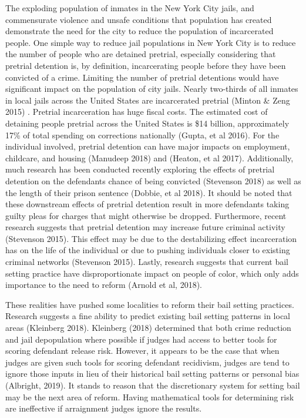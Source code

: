 \documentclass[
  english,
  man]{apa6}
\begin{document}
The exploding population of inmates in the New York City jails, and commensurate violence and unsafe conditions that population has created demonstrate the need for the city to reduce the population of incarcerated people. One simple way to reduce jail populations in New York City is to reduce the number of people who are detained pretrial, especially considering that pretrial detention is, by definition, incarcerating people before they have been convicted of a crime. Limiting the number of pretrial detentions would have significant impact on the population of city jails. Nearly two-thirds of all inmates in local jails across the United States are incarcerated pretrial (Minton \& Zeng 2015) . Pretrial incarceration has huge fiscal costs. The estimated cost of detaining people pretrial across the United States is \$14 billion, approximately 17\% of total spending on corrections nationally (Gupta, et al 2016). For the individual involved, pretrial detention can have major impacts on employment, childcare, and housing (Manudeep 2018) and (Heaton, et al 2017). Additionally, much research has been conducted recently exploring the effects of pretrial detention on the defendants chance of being convicted (Stevenson 2018) as well as the length of their prison sentence (Dobbie, et al 2018). It should be noted that these downstream effects of pretrial detention result in more defendants taking guilty pleas for charges that might otherwise be dropped. Furthermore, recent research suggests that pretrial detention may increase future criminal activity (Stevenson 2015). This effect may be due to the destabilizing effect incarceration has on the life of the individual or due to pushing individuals closer to existing criminal networks (Stevenson 2015). Lastly, research suggests that current bail setting practice have disproportionate impact on people of color, which only adds importance to the need to reform (Arnold et al, 2018).

These realities have pushed some localities to reform their bail setting practices. Research suggests a fine ability to predict existing bail setting patterns in local areas (Kleinberg 2018). Kleinberg (2018) determined that both crime reduction and jail depopulation where possible if judges had access to better tools for scoring defendant release risk. However, it appears to be the case that when judges are given such tools for scoring defendant recidivism, judges are tend to ignore those inputs in lieu of their historical bail setting patterns or personal bias (Albright, 2019). It stands to reason that the discretionary system for setting bail may be the next area of reform. Having mathematical tools for determining risk are ineffective if arraignment judges ignore the results.
\end{document}
